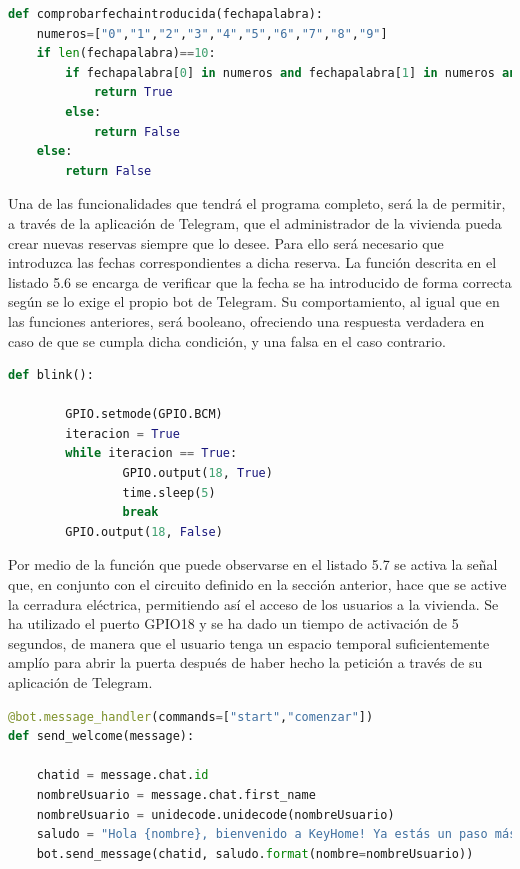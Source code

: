 \begin{lstlisting}[language=Python,
    caption={Función que verifica si se ha introducido una fecha de forma correcta},
    label=src:comprueba-formato-fecha
]
def comprobarfechaintroducida(fechapalabra):
    numeros=["0","1","2","3","4","5","6","7","8","9"]
    if len(fechapalabra)==10:
        if fechapalabra[0] in numeros and fechapalabra[1] in numeros and fechapalabra[2] in numeros and fechapalabra[3] in numeros and fechapalabra[5] in numeros and fechapalabra[6] in numeros and fechapalabra[8] in numeros and fechapalabra[9] in numeros:
            return True
        else:
            return False
    else:
        return False
\end{lstlisting}
Una de las funcionalidades que tendrá el programa completo, será la de permitir, a través de la aplicación de Telegram, que el administrador de la vivienda pueda crear nuevas reservas siempre que lo desee. Para ello será necesario que introduzca las fechas correspondientes a dicha reserva. La función descrita en el listado 5.6 se encarga de verificar que la fecha se ha introducido de forma correcta según se lo exige el propio bot de Telegram. Su comportamiento, al igual que en las funciones anteriores, será booleano, ofreciendo una respuesta verdadera en caso de que se cumpla dicha condición, y una falsa en el caso contrario.
\begin{lstlisting}[language=Python,
    caption={Función que activa una señal de voltaje desde la Raspberry Pi},
    label=src:activar-senal
]
def blink():
        
        GPIO.setmode(GPIO.BCM)
        iteracion = True
        while iteracion == True:
                GPIO.output(18, True)
                time.sleep(5)
                break
        GPIO.output(18, False)
\end{lstlisting}
Por medio de la función que puede observarse en el listado 5.7 se activa la señal que, en conjunto con el circuito definido en la sección anterior, hace que se active la cerradura eléctrica, permitiendo así el acceso de los usuarios a la vivienda. Se ha utilizado el puerto GPIO18 y se ha dado un tiempo de activación de 5 segundos, de manera que el usuario tenga un espacio temporal suficientemente amplío para abrir la puerta después de haber hecho la petición a través de su aplicación de Telegram.
\begin{lstlisting}[language=Python,
    caption={Primer contacto con el bot de Telegram},
    label=src:primer-contacto-con-bot
]
@bot.message_handler(commands=["start","comenzar"])
def send_welcome(message):
    
    chatid = message.chat.id
    nombreUsuario = message.chat.first_name
    nombreUsuario = unidecode.unidecode(nombreUsuario)
    saludo = "Hola {nombre}, bienvenido a KeyHome! Ya estás un paso más cerca de acceder a tu vivienda! Por favor, necesito que me indiques el número de tu reserva"
    bot.send_message(chatid, saludo.format(nombre=nombreUsuario))
\end{lstlisting}
